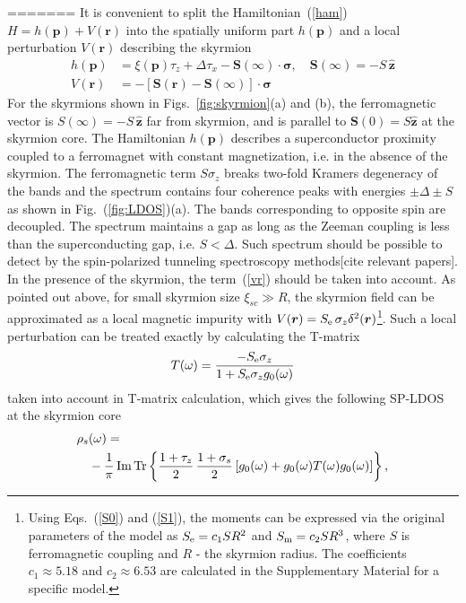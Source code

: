 \documentclass[twocolumn,showpacs,floatfix,nofootinbib,longbibliography]{revtex4-1}
\begin{document}
=======
It is convenient to split the Hamiltonian~(\ref{ham}) $H = h(\bm p)+V(\bm r)$ into the spatially uniform part $h(\bm p)$ and a local perturbation $V(\bm r)$ describing the skyrmion
\begin{align}
	h(\bm p) & =  \xi(\bm p)\tau_z+\Delta \tau_x - \bm S(\infty)\cdot\bm\sigma,\quad \bm S(\infty) = -S\,\hat{\bm z}\\
	V(\bm r) & =  - \left[\bm S(\bm r)-\bm S(\infty)\right]\cdot\bm\sigma  \label{vr}
\end{align}
For the skyrmions shown in Figs.~\ref{fig:skyrmion}(a) and (b), the ferromagnetic vector is $S(\infty) = -S\,\hat{\bm z}$ far from skyrmion, and is parallel to $\bm S(0)= S\hat{\bm z}$ at the skyrmion core. The Hamiltonian $h(\bm p)$ describes a superconductor proximity coupled to a ferromagnet with constant magnetization, i.e. in the absence of the skyrmion. The ferromagnetic term $S\sigma_z$ breaks two-fold Kramers degeneracy of the bands and the spectrum contains four coherence peaks with energies $\pm\Delta\pm S$ as shown in Fig.~(\ref{fig:LDOS})(a). The bands corresponding to opposite spin are decoupled. The spectrum maintains a gap as long as the Zeeman coupling is less than the superconducting gap, i.e. $S<\Delta$. Such spectrum should be possible to detect by the spin-polarized tunneling spectroscopy methods[cite relevant papers]. In the presence of the skyrmion, the term~(\ref{vr}) should be taken into account. As pointed out above, for small skyrmion size $\xi_{sc}\gg R$, the skyrmion field can be approximated as a local magnetic impurity with $V(\bm r)=S_{\rm e}\,\sigma_z \delta^2(\bm r)$\footnote{Using Eqs.~(\ref{S0}) and (\ref{S1}), the moments can be expressed via the original parameters of the model as $S_{\rm e} = c_1 S R^2$ and $S_{\rm m} = c_2 S R^3$, where $S$ is ferromagnetic coupling and $R$ - the skyrmion radius. The coefficients $c_1\approx 5.18$ and $c_2\approx 6.53$ are calculated in the Supplementary Material for a specific model. }. Such a local perturbation can be  treated exactly by calculating the T-matrix
\begin{align}
	T(\omega) =   \frac{-S_{\rm e}\sigma_z}{1+S_{\rm e}\sigma_zg_{0}(\omega)} \label{tm}
\end{align}
taken into account in T-matrix calculation, which gives the following SP-LDOS at the skyrmion core
\begin{align}
	\rho_s & (\omega) = \label{ldos} \\
	&-\frac{1}{\pi}\,{\rm Im}{\rm \,Tr} \left\{  \frac{1+\tau_z}{2}\,\frac{1+\sigma_s}{2} \left[g_0(\omega)+g_0(\omega) T(\omega) g_0(\omega)  \right]\right\},\nonumber
 \end{align}
\end{document}
